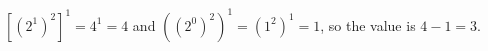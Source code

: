$\left[\left(2^1\right)^2\right]^1=4^1=4$ and $\left(\left(2^0\right)^2\right)^1=\left(1^2\right)^1=1$, so the value is $4-1=\boxed{3}$.
